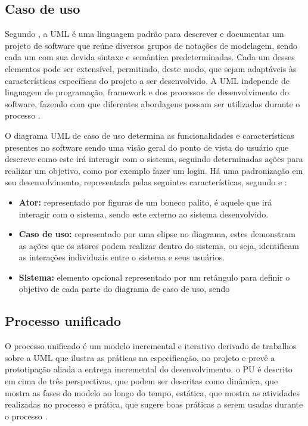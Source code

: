 \subsection{Caso de uso}
Segundo , a UML é uma linguagem padrão para descrever e documentar um projeto de software que reúne diversos grupos de notações de modelagem, sendo cada um com sua devida sintaxe e semântica predeterminadas. Cada um desses elementos pode ser extensível, permitindo, deste modo, que sejam adaptáveis às características específicas do projeto a ser desenvolvido. A UML independe de linguagem de programação, framework e dos processos de desenvolvimento do software, fazendo com que diferentes abordagens possam ser utilizadas durante o processo \cite{BEZERRA}.

O diagrama UML de caso de uso determina as funcionalidades e características presentes no software sendo uma visão geral do ponto de vista do usuário que descreve como este irá interagir com o sistema, seguindo determinadas ações para realizar um objetivo, como por exemplo fazer um login. Há uma padronização em seu desenvolvimento, representada pelas seguintes características, segundo  e :
\begin{itemize}
    \item \textbf{Ator: }representado por figuras de um boneco palito, é aquele que irá interagir com o sistema, sendo este externo ao sistema desenvolvido.
    \item \textbf{Caso de uso: }representado por uma elipse no diagrama, estes demonstram as ações que os atores podem realizar dentro do sistema, ou seja, identificam as interações individuais entre o sistema e seus usuários. 
    \item \textbf{Sistema: }elemento opcional representado por um retângulo para definir o objetivo de cada parte do diagrama de caso de uso, sendo 
\end{itemize}

\subsection{Processo unificado}
O processo unificado é um modelo incremental e iterativo derivado de trabalhos sobre a UML que ilustra as práticas na especificação, no projeto e prevê a prototipação aliada a entrega incremental do desenvolvimento. o PU é descrito em cima de três perspectivas, que podem ser descritas como dinâmica, que mostra as fases do modelo ao longo do tempo, estática, que mostra as atividades realizadas no processo e prática, que sugere boas práticas a serem usadas durante o processo \cite{SOMMERVILE}.


